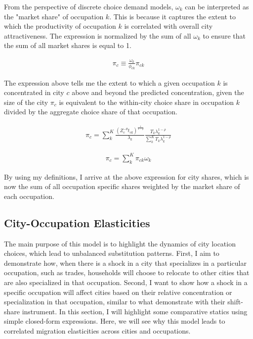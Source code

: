\documentclass[10pt]{article}
\begin{document}
From the perspective of discrete choice demand models, $\omega_k$ can be interpreted as the "market share" of occupation $k$. This is because it captures the extent to which the productivity of occupation $k$ is correlated with overall city attractiveness. The expression is normalized by the sum of all $\omega_k$ to ensure that the sum of all market shares is equal to 1.

\begin{align}
    \pi_c \equiv \frac{\omega_k}{\phi_{ck}} \pi_{ck}
    \label{identity}
\end{align}

The expression above tells me the extent to which a given occupation $k$ is concentrated in city $c$ above and beyond the predicted concentration, given the size of the city $\pi_c$ is equivalent to the within-city choice share in occupation $k$ divided by the aggregate choice share of that occupation.

\begin{align*}
    \pi_{c} = \sum_{k}^{K} \frac{(Z_{c}^{-\theta} t_{ck})^{\frac{1}{1-\rho}}}{\lambda_k} \frac{T_k \lambda_{k}^{1 - \rho}}{\sum \limits_{k}^{K} T_k \lambda_{k}^{1-\rho}}
\end{align*}

\begin{align}
    \pi_c = \sum_{k}^{K} \pi_{ck} \omega_k
\end{align}

By using my definitions, I arrive at the above expression for city shares, which is now the sum of all occupation specific shares weighted by the market share of each occupation.

\subsection{City-Occupation Elasticities}

The main purpose of this model is to highlight the dynamics of city location choices, which lead to unbalanced substitution patterns. First, I aim to demonstrate how, when there is a shock in a city that specializes in a particular occupation, such as trades, households will choose to relocate to other cities that are also specialized in that occupation. Second, I want to show how a shock in a specific occupation will affect cities based on their relative concentration or specialization in that occupation, similar to what \cite{adh2013} demonstrate with their shift-share instrument. In this section, I will highlight some comparative statics using simple closed-form expressions. Here, we will see why this model leads to correlated migration elasticities across cities and occupations.
\end{document}
